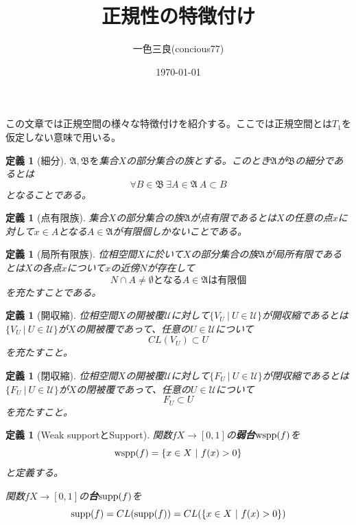 \documentclass[leqno]{jsarticle}
\title{正規性の特徴付け}
\author{一色三良(concious77)}
\date{\today}
\newtheorem{df}[thm]{定義}
\newcommand{\supp}{\text{{\rm supp}}}
\newcommand{\wspp}{\text{{\rm wspp}}}
\begin{document}
\maketitle
この文章では正規空間の様々な特徴付けを紹介する。ここでは正規空間とは$T_1$を仮定しない意味で用いる。

\begin{df}[細分]$\mathfrak{A},\mathfrak{B}を$集合$X$の部分集合の族とする。このとき$\mathfrak{A}$が$\mathfrak{B}$の細分であるとは
\[
\forall B\in \mathfrak{B}\ \exists A\in \mathfrak{A}\ A\subset B
\]
となることである。
\end{df}

\begin{df}[点有限族]集合$X$の部分集合の族$\mathfrak{A}$が点有限であるとは$X$の任意の点$x$に対して$x\in A$となる$A\in \mathfrak{A}$が有限個しかないことである。

\end{df}

\begin{df}[局所有限族]位相空間$X$に於いて$X$の部分集合の族$\mathfrak{A}$が局所有限であるとは$X$の各点$x$について$x$の近傍$N$が存在して
\[
N\cap A\neq \emptyset となるA\in \mathfrak{A}は有限個
\]
を充たすことである。
\end{df}

\begin{df}[開収縮]位相空間$X$の開被覆$\mathcal{U}$に対して$\{V_U\ |\ U\in \mathcal{U}\}$が開収縮であるとは$\{V_U\ |\ U\in \mathcal{U}\}$が$X$の開被覆であって、任意の$U\in \mathcal{U}$について
\[
CL(V_U)\subset U
\]
を充たすこと。
\end{df}

\begin{df}[閉収縮]位相空間$X$の開被覆$\mathcal{U}$に対して$\{F_U\ |\ U\in \mathcal{U}\}$が閉収縮であるとは$\{F_U\ |\ U\in \mathcal{U}\}$が$X$の閉被覆であって、任意の$U\in \mathcal{U}$について
\[
F_{U}\subset U
\]
を充たすこと。
\end{df}


\begin{df}[Weak supportとSupport]
関数$fX\to [0,1]$の{\bf 弱台}$\wspp (f)$を
\[
\wspp (f)=\{x\in X\ |\ f(x)>0\}
\]
と定義する。\par
関数$fX\to [0,1]$の{\bf 台}$\supp (f)$を
\[
\supp (f)=CL(\supp(f))=CL(\{x\in X\ |\ f(x)>0\})
\]

\end{df}
\end{document}
